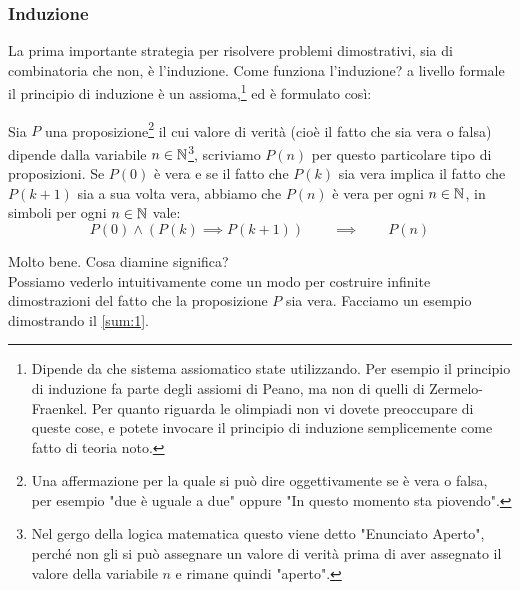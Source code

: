 \documentclass[11pt]{scrartcl}
\begin{document}
	\subsubsection{Induzione}
	La prima importante strategia per risolvere problemi dimostrativi, sia di combinatoria che non, è l'induzione.
	Come funziona l'induzione? a livello formale il principio di induzione è un assioma,\footnote{Dipende da che sistema assiomatico state utilizzando. Per esempio il principio di induzione fa parte degli assiomi di Peano, ma non di quelli di Zermelo-Fraenkel. Per quanto riguarda le olimpiadi non vi dovete preoccupare di queste cose, e potete invocare il principio di induzione semplicemente come fatto di teoria noto.} ed è formulato così:
	\begin{proposition}[Induzione]
		Sia $P$ una proposizione\footnote{Una affermazione per la quale si può dire oggettivamente se è vera o falsa, per esempio "due è uguale a due" oppure "In questo momento sta piovendo".} il cui valore di verità (cioè il fatto che sia vera o falsa) dipende dalla variabile $n\in\mathbb N$\footnote{Nel gergo della logica matematica questo viene detto "Enunciato Aperto", perché non gli si può assegnare un valore di verità prima di aver assegnato il valore della variabile $n$ e rimane quindi "aperto".}, scriviamo $P(n)$ per questo particolare tipo di proposizioni. Se $P(0)$ è vera e se il fatto che $P(k)$ sia vera implica il fatto che $P(k+1)$ sia a sua volta vera, abbiamo che $P(n)$ è vera per ogni $n\in\mathbb N$, in simboli per ogni $n\in\mathbb N$ vale:
		$$P(0) \land (P(k)\implies P(k+1)) \qquad \implies \qquad P(n) $$
	\end{proposition}
	Molto bene. Cosa diamine significa? \\
	Possiamo vederlo intuitivamente come un modo per costruire infinite dimostrazioni del fatto che la proposizione $P$ sia vera. Facciamo un esempio dimostrando il \cref{sum:1}.
\end{document}
